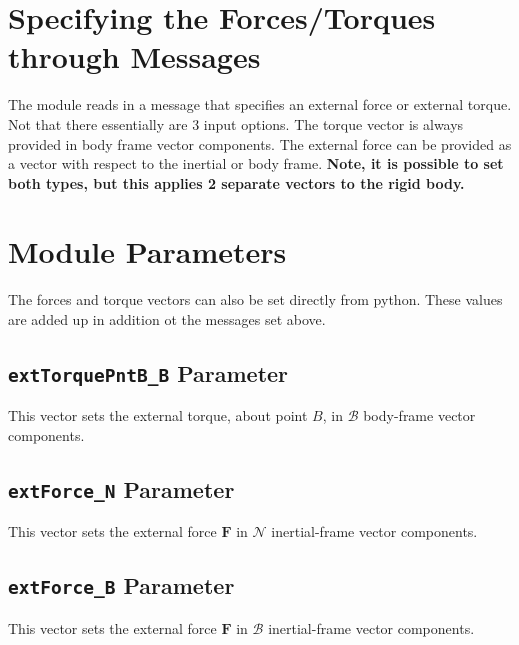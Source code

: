 \documentclass[]{BasiliskReportMemo}
\begin{document}
\section{Specifying the Forces/Torques through Messages}
The module reads in a message that specifies  an external force or external torque.  Not that there essentially are  3 input options.  The torque vector is always provided in body frame vector components.  The external force can be provided as a vector with respect to the inertial or body frame.  {\bfseries Note, it is possible to set both types, but this applies 2 separate vectors to the rigid body.}






\section{Module Parameters}
The forces and torque vectors  can also be set directly from python.  These values are added up in addition ot the messages set above.


\subsection{{\tt extTorquePntB\_B} Parameter}
This vector sets the external torque, about point $B$, in $\mathcal{B}$ body-frame vector components.

\subsection{{\tt extForce\_N} Parameter}
This vector sets the external force $\bm F$ in $\mathcal{N}$ inertial-frame vector components.

\subsection{{\tt extForce\_B} Parameter}
This vector sets the external force $\bm F$ in $\mathcal{B}$ inertial-frame vector components.
\end{document}
